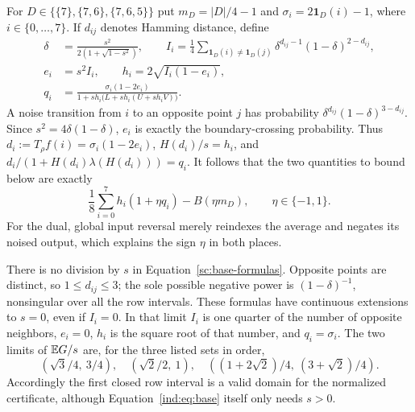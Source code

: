 For $D\in\{\{7\},\{7,6\},\{7,6,5\}\}$ put
$m_D=|D|/4-1$ and $\sigma_i=2\mathbf1_D(i)-1$, where
$i\in\{0,\ldots,7\}$.  If $d_{ij}$ denotes Hamming distance, define
\begin{align}
 \delta&=\frac{s^2}{2(1+\sqrt{1-s^2})},\qquad
 I_i=\frac14\sum_{\mathbf1_D(i)\ne\mathbf1_D(j)}
            \delta^{d_{ij}-1}(1-\delta)^{2-d_{ij}},\nonumber\\
 e_i&=s^2I_i,\qquad h_i=2\sqrt{I_i(1-e_i)},\label{sc:base-formulas}\\
 q_i&=\frac{\sigma_i(1-2e_i)}
                {1+sh_i\bigl(L+sh_i(U+sh_iV)\bigr)}.\nonumber
\end{align}
A noise transition from $i$ to an opposite point $j$ has probability
$\delta^{d_{ij}}(1-\delta)^{3-d_{ij}}$.  Since
$s^2=4\delta(1-\delta)$, $e_i$ is exactly the boundary-crossing probability.
Thus $d_i:=T_\rho f(i)=\sigma_i(1-2e_i)$,
$H(d_i)/s=h_i$, and
$d_i/(1+H(d_i)\lambda(H(d_i)))=q_i$.
It follows that the two quantities to bound below are exactly
\begin{equation}\label{sc:base-normalized}
 \frac18\sum_{i=0}^7h_i(1+\eta q_i)-B(\eta m_D),
                   \qquad \eta\in\{-1,1\}.
\end{equation}
For the dual, global input reversal merely reindexes the average and
negates its noised output, which explains the sign $\eta$ in both places.

There is no division by $s$ in Equation~\eqref{sc:base-formulas}.  Opposite points
are distinct, so $1\leq d_{ij}\leq3$; the sole possible negative power is
$(1-\delta)^{-1}$, nonsingular over all the row intervals.
These formulas have continuous extensions to $s=0$, even if $I_i=0$.
In that limit $I_i$ is one quarter of the number of opposite neighbors,
$e_i=0$, $h_i$ is the square root of that number, and $q_i=\sigma_i$.
The two limits of $\mathbb E G/s$ are, for the three listed sets in order,
\[
 (\sqrt3/4,\ 3/4),\quad
 (\sqrt2/2,\ 1),\quad
 ((1+2\sqrt2)/4,\ (3+\sqrt2)/4).
\]
Accordingly the first closed row interval is a valid domain for the
normalized certificate, although Equation~\eqref{ind:eq:base} itself only needs
$s>0$.

